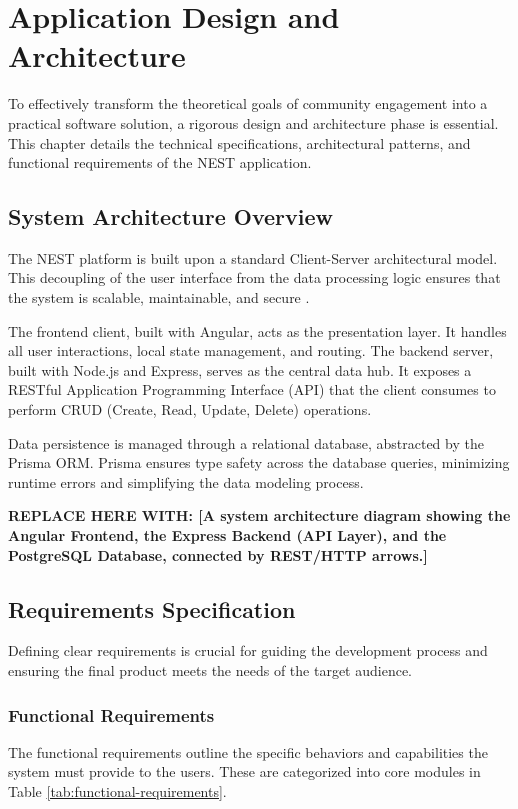 \chapter{Application Design and Architecture}
\label{chap:app-design-architecture}

To effectively transform the theoretical goals of community engagement into a practical software solution, a rigorous design and architecture phase is essential. This chapter details the technical specifications, architectural patterns, and functional requirements of the NEST application.

\section{System Architecture Overview}
The NEST platform is built upon a standard Client-Server architectural model. This decoupling of the user interface from the data processing logic ensures that the system is scalable, maintainable, and secure \cite{fowler2002patterns}.

The frontend client, built with Angular, acts as the presentation layer. It handles all user interactions, local state management, and routing. The backend server, built with Node.js and Express, serves as the central data hub. It exposes a RESTful Application Programming Interface (API) that the client consumes to perform CRUD (Create, Read, Update, Delete) operations. 

Data persistence is managed through a relational database, abstracted by the Prisma ORM. Prisma ensures type safety across the database queries, minimizing runtime errors and simplifying the data modeling process.

\textbf{REPLACE HERE WITH: [A system architecture diagram showing the Angular Frontend, the Express Backend (API Layer), and the PostgreSQL Database, connected by REST/HTTP arrows.]}

\section{Requirements Specification}
Defining clear requirements is crucial for guiding the development process and ensuring the final product meets the needs of the target audience.

\subsection{Functional Requirements}
The functional requirements outline the specific behaviors and capabilities the system must provide to the users. These are categorized into core modules in Table \ref{tab:functional-requirements}.

